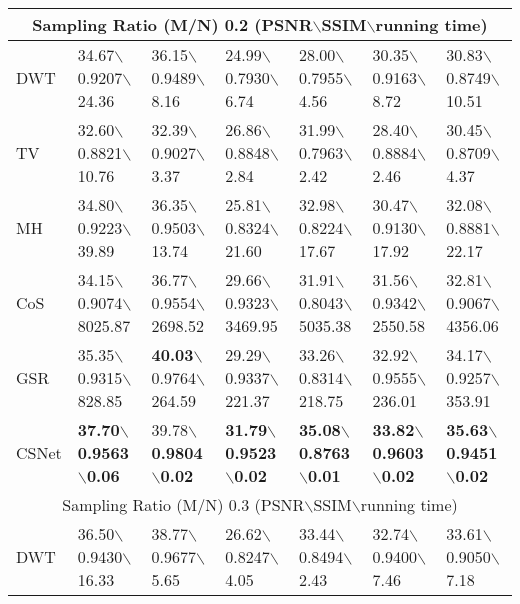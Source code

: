 \documentclass[5pt]{article}
\begin{document}
\begin{table*}[t]
\begin{tabular}{|l|l|l|l|l|l|l|}
\hline
\multicolumn{7}{|c|}{Sampling Ratio (M/N) 0.2 (PSNR$\backslash$SSIM$\backslash$running time)}\\
\hline
DWT & 34.67$\backslash$0.9207$\backslash$24.36 & 36.15$\backslash$0.9489$\backslash$8.16 & 24.99$\backslash$0.7930$\backslash$6.74 & 28.00$\backslash$0.7955$\backslash$4.56 & 30.35$\backslash$0.9163$\backslash$8.72 & 30.83$\backslash$0.8749$\backslash$10.51\\
\hline
TV & 32.60$\backslash$0.8821$\backslash$10.76 & 32.39$\backslash$0.9027$\backslash$3.37 & 26.86$\backslash$0.8848$\backslash$2.84 & 31.99$\backslash$0.7963$\backslash$2.42 & 28.40$\backslash$0.8884$\backslash$2.46 & 30.45$\backslash$0.8709$\backslash$4.37\\
\hline
MH & 34.80$\backslash$0.9223$\backslash$39.89 & 36.35$\backslash$0.9503$\backslash$13.74 & 25.81$\backslash$0.8324$\backslash$21.60 & 32.98$\backslash$0.8224$\backslash$17.67 & 30.47$\backslash$0.9130$\backslash$17.92 & 32.08$\backslash$0.8881$\backslash$22.17\\
\hline
CoS & 34.15$\backslash$0.9074$\backslash$\tiny 8025.87 & 36.77$\backslash$0.9554$\backslash$\tiny 2698.52 & 29.66$\backslash$0.9323$\backslash$\tiny 3469.95 & 31.91$\backslash$0.8043$\backslash$\tiny 5035.38 & 31.56$\backslash$0.9342$\backslash$\tiny 2550.58 & 32.81$\backslash$0.9067$\backslash$\tiny 4356.06\\
\hline
GSR & 35.35$\backslash$0.9315$\backslash$828.85 & \textbf{40.03}$\backslash$0.9764$\backslash$264.59 & 29.29$\backslash$0.9337$\backslash$221.37 & 33.26$\backslash$0.8314$\backslash$218.75 & 32.92$\backslash$0.9555$\backslash$236.01 & 34.17$\backslash$0.9257$\backslash$353.91\\
\hline
CSNet & \textbf{37.70}$\backslash$\textbf{0.9563}$\backslash$\textbf{0.06} & 39.78$\backslash$\textbf{0.9804}$\backslash$\textbf{0.02} & \textbf{31.79}$\backslash$\textbf{0.9523}$\backslash$\textbf{0.02} & \textbf{35.08}$\backslash$\textbf{0.8763}$\backslash$\textbf{0.01} & \textbf{33.82}$\backslash$\textbf{0.9603}$\backslash$\textbf{0.02} & \textbf{35.63}$\backslash$\textbf{0.9451}$\backslash$\textbf{0.02}\\
\hline
\multicolumn{7}{|c|}{Sampling Ratio (M/N) 0.3 (PSNR$\backslash$SSIM$\backslash$running time)}\\
\hline
DWT & 36.50$\backslash$0.9430$\backslash$16.33 & 38.77$\backslash$0.9677$\backslash$5.65 & 26.62$\backslash$0.8247$\backslash$4.05 & 33.44$\backslash$0.8494$\backslash$2.43 & 32.74$\backslash$0.9400$\backslash$7.46 & 33.61$\backslash$0.9050$\backslash$7.18\\

\end{tabular}
\end{table*}
\end{document}
